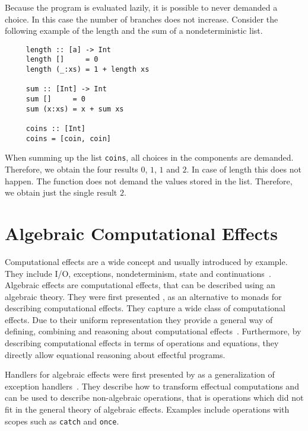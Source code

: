 Because the program is evaluated lazily, it is possible to never demanded a choice.
In this case the number of branches does not increase.
Consider the following example of the length and the sum of a nondeterministic list.
\begin{verbatim}
     length :: [a] -> Int
     length []     = 0
     length (_:xs) = 1 + length xs

     sum :: [Int] -> Int
     sum []     = 0
     sum (x:xs) = x + sum xs

     coins :: [Int]
     coins = [coin, coin]
\end{verbatim}
When summing up the list \texttt{coins}, all choices in the components are
demanded.
Therefore, we obtain the four results $0$, $1$, $1$ and $2$.
In case of length this does not happen.
The function does not demand the values stored in the list.
Therefore, we obtain just the single result $2$.


\section{Algebraic Computational Effects}

Computational effects are a wide concept and usually introduced by example.
They include I/O, exceptions, nondeterminism, state and
continuations~\cite{DBLP:conf/fossacs/PlotkinP02,DBLP:journals/corr/abs-1807-05923}.
Algebraic effects are computational effects, that can be described using an
algebraic theory.
They were first presented \textcite{DBLP:conf/fossacs/PlotkinP02}, as an
alternative to monads for describing computational effects.
They capture a wide class of computational effects.
Due to their uniform representation they provide a general way of defining,
combining and reasoning about computational
effects~\cite{DBLP:journals/corr/PlotkinP13}.
Furthermore, by describing computational effects in terms of operations and
equations, they directly allow equational reasoning about effectful programs.

Handlers for algebraic effects were first presented by
\citeauthor{DBLP:conf/esop/PlotkinP09} as a generalization of exception
handlers~\cite{DBLP:conf/esop/PlotkinP09}.
They describe how to transform effectual computations and can be used to
describe non-algebraic operations, that is operations which did not fit in the
general theory of algebraic effects.
Examples include operations with scopes such as \texttt{catch} and
\texttt{once}.

